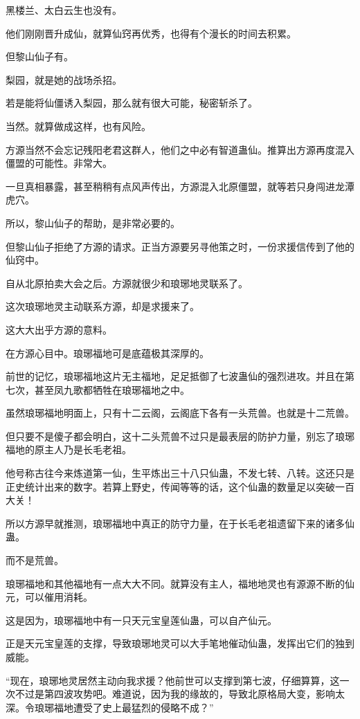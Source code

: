 \begin{this_body}
黑楼兰、太白云生也没有。

他们刚刚晋升成仙，就算仙窍再优秀，也得有个漫长的时间去积累。

但黎山仙子有。

梨园，就是她的战场杀招。

若是能将仙僵诱入梨园，那么就有很大可能，秘密斩杀了。

当然。就算做成这样，也有风险。

方源当然不会忘记残阳老君这群人，他们之中必有智道蛊仙。推算出方源再度混入僵盟的可能性。非常大。

一旦真相暴露，甚至稍稍有点风声传出，方源混入北原僵盟，就等若只身闯进龙潭虎穴。

所以，黎山仙子的帮助，是非常必要的。

但黎山仙子拒绝了方源的请求。正当方源要另寻他策之时，一份求援信传到了他的仙窍中。

自从北原拍卖大会之后。方源就很少和琅琊地灵联系了。

这次琅琊地灵主动联系方源，却是求援来了。

这大大出乎方源的意料。

在方源心目中。琅琊福地可是底蕴极其深厚的。

前世的记忆，琅琊福地这片无主福地，足足抵御了七波蛊仙的强烈进攻。并且在第七次，甚至凤九歌都牺牲在琅琊福地之中。

虽然琅琊福地明面上，只有十二云阁，云阁底下各有一头荒兽。也就是十二荒兽。

但只要不是傻子都会明白，这十二头荒兽不过只是最表层的防护力量，别忘了琅琊福地的原主人乃是长毛老祖。

他号称古往今来炼道第一仙，生平炼出三十八只仙蛊，不发七转、八转。这还只是正史统计出来的数字。若算上野史，传闻等等的话，这个仙蛊的数量足以突破一百大关！

所以方源早就推测，琅琊福地中真正的防守力量，在于长毛老祖遗留下来的诸多仙蛊。

而不是荒兽。

琅琊福地和其他福地有一点大大不同。就算没有主人，福地地灵也有源源不断的仙元，可以催用消耗。

这是因为，琅琊福地中有一只天元宝皇莲仙蛊，可以自产仙元。

正是天元宝皇莲的支撑，导致琅琊地灵可以大手笔地催动仙蛊，发挥出它们的独到威能。

“现在，琅琊地灵居然主动向我求援？他前世可以支撑到第七波，仔细算算，这一次不过是第四波攻势吧。难道说，因为我的缘故的，导致北原格局大变，影响太深。令琅琊福地遭受了史上最猛烈的侵略不成？”


\end{this_body}
